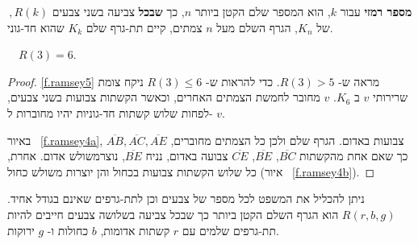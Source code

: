 \begin{definition}
$\, ,R(k)$
\textbf{מספר רמזי}
עבור 
$k$,
הוא המספר שלם הקטן ביותר 
$n$,
כך 
\textbf{שבכל}
צביעה בשני צבעים של
$K_{n}$,
הגרף השלם מעל 
$n$
צמתים, קיים תת-גרף שלם 
$K_k$
שהוא חד-גוני.
\end{definition}
\begin{theorem}[\L{Ramsey}]
$\quad R(3)=6$.\label{thm.ramsey}
\end{theorem}

\begin{proof}
\ref{f.ramsey5}
מראה ש-%
$R(3)>5$.
כדי להראות ש-%
$R(3)\leq 6$
ניקח צומת שרירותי 
$v$
ב%
$K_6$.
$v$
מחובר לחמשת הצמתים האחרים, וכאשר הקשתות צבועות בשני צבעים, לפחות שלוש קשתות חד-גוניות יהיו מחוברות ל-%
$v$. 

באיור%
~\ref{f.ramsey4a}, $\overline{AB}, \overline{AC}, \overline{AE}$ 
צבועות באדום. הגרף שלם ולכן כל הצמתים מחוברים, כך שאם אחת מהקשתות 
$\overline{BC}$, $\overline{BE}$, $\overline{CE}$
צבועה באדום, נניח
$\overline{BE}$,
נוצרמשולש אדום. אחרת, כל שלוש הקשתות צבועות בכחול והן יוצרות משולש כחול 
(איור%
~\ref{f.ramsey4b}).
\end{proof}

ניתן להכליל את המשפט לכל מספר של צבעים וכן לתת-גרפים שאינם בגודל אחיד. 
$R(r,b,g)$
הוא הגרף השלם הקטן ביותר כך שבכל צביעה בשלושה צבעים חייבים להיות תת-גרפים שלמים עם 
$r$
קשתות אדומות, 
$b$
כחולות ו-%
$g$
ירוקות.

